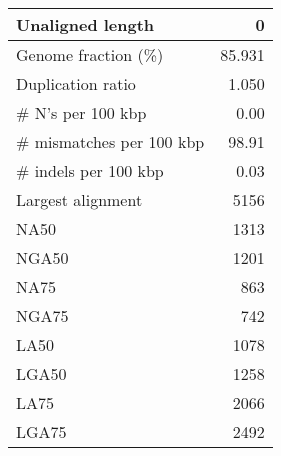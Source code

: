 \documentclass[12pt,a4paper]{article}
\begin{document}
\begin{table}[ht]
\begin{center}
\begin{tabular}{|l*{1}{|r}|}
Unaligned length & 0 \\ \hline
Genome fraction (\%) & 85.931 \\ \hline
Duplication ratio & 1.050 \\ \hline
\# N's per 100 kbp & 0.00 \\ \hline
\# mismatches per 100 kbp & 98.91 \\ \hline
\# indels per 100 kbp & 0.03 \\ \hline
Largest alignment & 5156 \\ \hline
NA50 & 1313 \\ \hline
NGA50 & 1201 \\ \hline
NA75 & 863 \\ \hline
NGA75 & 742 \\ \hline
LA50 & 1078 \\ \hline
LGA50 & 1258 \\ \hline
LA75 & 2066 \\ \hline
LGA75 & 2492 \\ \hline
\end{tabular}
\end{center}
\end{table}
\end{document}
